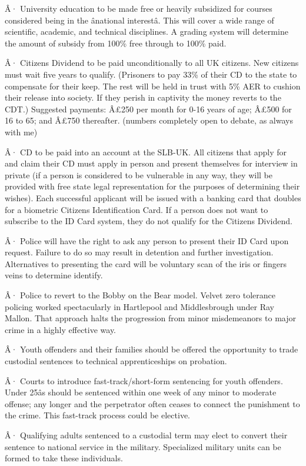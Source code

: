 \documentclass[]{tufte-handout}
\begin{document}
Â· University education to be made free or heavily subsidized for
courses considered being in the ânational interestâ. This will cover
a wide range of scientific, academic, and technical disciplines. A
grading system will determine the amount of subsidy from 100\% free
through to 100\% paid.

Â· Citizens Dividend to be paid unconditionally to all UK citizens. New
citizens must wait five years to qualify. (Prisoners to pay 33\% of
their CD to the state to compensate for their keep. The rest will be
held in trust with 5\% AER to cushion their release into society. If
they perish in captivity the money reverts to the CDT.) Suggested
payments: Â£250 per month for 0-16 years of age; Â£500 for 16 to 65; and
Â£750 thereafter. (numbers completely open to debate, as always with me)

Â· CD to be paid into an account at the SLB-UK. All citizens that apply
for and claim their CD must apply in person and present themselves for
interview in private (if a person is considered to be vulnerable in any
way, they will be provided with free state legal representation for the
purposes of determining their wishes). Each successful applicant will be
issued with a banking card that doubles for a biometric Citizens
Identification Card. If a person does not want to subscribe to the ID
Card system, they do not qualify for the Citizens Dividend.

Â· Police will have the right to ask any person to present their ID Card
upon request. Failure to do so may result in detention and further
investigation. Alternatives to presenting the card will be voluntary
scan of the iris or fingers veins to determine identify.

Â· Police to revert to the Bobby on the Bear model. Velvet zero
tolerance policing worked spectacularly in Hartlepool and Middlesbrough
under Ray Mallon. That approach halts the progression from minor
misdemeanors to major crime in a highly effective way.

Â· Youth offenders and their families should be offered the opportunity
to trade custodial sentences to technical apprenticeships on probation.

Â· Courts to introduce fast-track/short-form sentencing for youth
offenders. Under 25âs should be sentenced within one week of any minor
to moderate offense; any longer and the perpetrator often ceases to
connect the punishment to the crime. This fast-track process could be
elective.

Â· Qualifying adults sentenced to a custodial term may elect to convert
their sentence to national service in the military. Specialized military
units can be formed to take these individuals.
\end{document}
